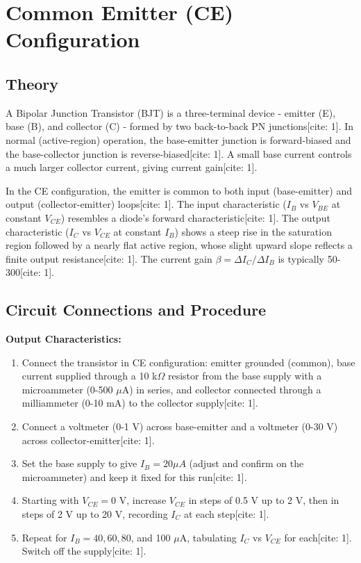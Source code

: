 \documentclass[12pt,a4paper]{article}
\begin{document}
\section{Common Emitter (CE) Configuration}

\subsection{Theory}
A Bipolar Junction Transistor (BJT) is a three-terminal device - emitter (E), base (B), and collector (C) - formed by two back-to-back PN junctions[cite: 1]. In normal (active-region) operation, the base-emitter junction is forward-biased and the base-collector junction is reverse-biased[cite: 1]. A small base current controls a much larger collector current, giving current gain[cite: 1]. 

In the CE configuration, the emitter is common to both input (base-emitter) and output (collector-emitter) loops[cite: 1]. The input characteristic ($I_B$ vs $V_{BE}$ at constant $V_{CE}$) resembles a diode's forward characteristic[cite: 1]. The output characteristic ($I_C$ vs $V_{CE}$ at constant $I_B$) shows a steep rise in the saturation region followed by a nearly flat active region, whose slight upward slope reflects a finite output resistance[cite: 1]. The current gain $\beta=\Delta I_C/\Delta I_B$ is typically 50-300[cite: 1].

\subsection{Circuit Connections and Procedure}
\textbf{Output Characteristics:}
\begin{enumerate}
    \item Connect the transistor in CE configuration: emitter grounded (common), base current supplied through a 10 k$\Omega$ resistor from the base supply with a microammeter (0-500 $\mu$A) in series, and collector connected through a milliammeter (0-10 mA) to the collector supply[cite: 1].
    \item Connect a voltmeter (0-1 V) across base-emitter and a voltmeter (0-30 V) across collector-emitter[cite: 1].
    \item Set the base supply to give $I_B=20\mu A$ (adjust and confirm on the microammeter) and keep it fixed for this run[cite: 1].
    \item Starting with $V_{CE}=0$ V, increase $V_{CE}$ in steps of 0.5 V up to 2 V, then in steps of 2 V up to 20 V, recording $I_C$ at each step[cite: 1].
    \item Repeat for $I_B=40, 60, 80$, and 100 $\mu$A, tabulating $I_C$ vs $V_{CE}$ for each[cite: 1]. Switch off the supply[cite: 1].
\end{enumerate}
\end{document}
